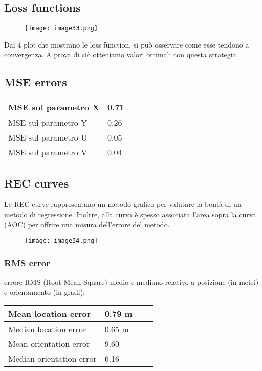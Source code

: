 \subsection{Loss functions}
\begin{figure}[H]
	\centering
	\texttt{[image: image33.png]}
\end{figure}
Dai 4 plot che mostrano le loss function, si può osservare come esse tendono a convergenza. A prova di ciò otteniamo valori ottimali con questa strategia.

\subsection{MSE errors}
\begin{center}
	\begin{tabular}{| l | l | l | l |}
		\hline
		MSE sul parametro X & 0.71 \\ \hline
		MSE sul parametro Y & 0.26 \\ \hline
		MSE sul parametro U & 0.05 \\ \hline
		MSE sul parametro V & 0.04 \\ \hline							
	\end{tabular}
\end{center}

\subsection{REC curves}
Le REC curve rappresentano un metodo grafico per valutare la bontà di un metodo di regressione. Inoltre, alla curva è spesso associata l'area sopra la curva (AOC) per offrire una misura dell'errore del metodo.
\begin{figure}[H]
	\centering
	\texttt{[image: image34.png]}
\end{figure}

\subsubsection{RMS error}
errore RMS (Root Mean Square) medio e mediano relativo a posizione (in metri) e orientamento (in gradi):
\begin{center}
	\begin{tabular}{| l | l | l | l |}
		\hline
		Mean location error & 0.79 m \\ \hline
		Median location error & 0.65 m \\ \hline
		Mean orientation error & {9.60\textdegree} \\ \hline
		Median orientation error & {6.16\textdegree} \\ \hline							
	\end{tabular}
\end{center}
